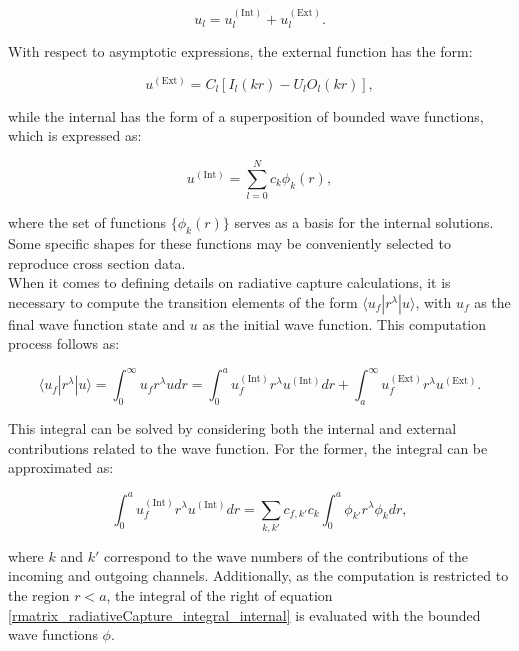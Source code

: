 \documentclass[openany]{book}
\begin{document}
\begin{equation}\label{rmatrix_internal_external}
	u_l = u^{(\mathrm{Int})}_l +  u^{(\mathrm{Ext})}_l.
\end{equation} 

With respect to asymptotic expressions, the external function has the form: 

\begin{equation}\label{rmatrix_external_asymptotic}
	u^{(\mathrm{Ext})} = C_l [I_l(kr) - U_l O_l(kr)],
\end{equation} 

while the internal has the form of a superposition of bounded wave functions, which is expressed as: 

\begin{equation}\label{rmatrix_internal_asymptotic}
	u^{(\mathrm{Int})} = \sum_{l=0}^{N} c_k \phi_k(r),
\end{equation} 

where the set of functions $\{\phi_k(r)\}$ serves as a basis for the internal solutions. Some specific shapes for these functions may be conveniently selected to reproduce cross section data. \\

When it comes to defining details on radiative capture calculations, it is necessary to compute the transition elements of the form $\langle u_f | r^\lambda| u \rangle $, with $u_f$ as the final wave function state and $u$ as the initial wave function. This computation process follows as:

\begin{equation}\label{rmatrix_radiativeCapture_integral}
	\langle u_f | r^\lambda| u \rangle  = \int_0^{\infty} u_f r^\lambda u  dr =  \int_0^{a} u_f^{(\mathrm{Int})} r^\lambda u^{(\mathrm{Int})}  dr + \int_a^{\infty} u_f^{(\mathrm{Ext})} r^\lambda u^{(\mathrm{Ext})}  .
\end{equation}

This integral can be solved by considering both the internal and external contributions related to the wave function. For the former, the integral can be approximated as: 

\begin{equation}\label{rmatrix_radiativeCapture_integral_internal}
	\int_0^{a} u^{(\mathrm{Int})}_f r^\lambda u^{(\mathrm{Int})}  dr  = \sum_{k, k'} c_{f, k'} c_{k} \int_0^{a} \phi_{k'} r^\lambda \phi_{k}dr, 
\end{equation}

where $k$ and $k'$ correspond to the wave numbers of the contributions of the incoming and outgoing channels. Additionally, as the computation is restricted to the region $r < a$, the integral of the right of equation \ref{rmatrix_radiativeCapture_integral_internal} is evaluated with the bounded wave functions $\phi$. \\
\end{document}

